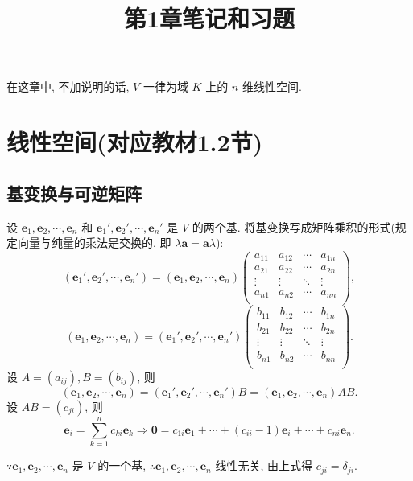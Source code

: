 \documentclass{ctexart}
\title{第1章笔记和习题}
\begin{document}
\maketitle
在这章中, 不加说明的话, $V$ 一律为域 $K$ 上的 $n$ 维线性空间.
\section{线性空间(对应教材1.2节)}
\subsection{基变换与可逆矩阵}
设 $\boldsymbol{e}_1,\boldsymbol{e}_2,\cdots,\boldsymbol{e}_n$ 和 $\boldsymbol{e}_1',\boldsymbol{e}_2',\cdots,\boldsymbol{e}_n'$ 是 $V$ 的两个基. 将基变换写成矩阵乘积的形式(规定向量与纯量的乘法是交换的, 即 $\lambda\boldsymbol{a}=\boldsymbol{a}\lambda$):
\begin{equation}\label{eq1.1}
    (\boldsymbol{e}_1',\boldsymbol{e}_2',\cdots,\boldsymbol{e}_n')=(\boldsymbol{e}_1,\boldsymbol{e}_2,\cdots,\boldsymbol{e}_n)\begin{pmatrix}
        a_{11} & a_{12} & \cdots & a_{1n} \\
        a_{21} & a_{22} & \cdots & a_{2n} \\
        \vdots & \vdots & \ddots & \vdots \\
        a_{n1} & a_{n2} & \cdots & a_{nn} \\
    \end{pmatrix},
\end{equation}
\[(\boldsymbol{e}_1,\boldsymbol{e}_2,\cdots,\boldsymbol{e}_n)=(\boldsymbol{e}_1',\boldsymbol{e}_2',\cdots,\boldsymbol{e}_n')\begin{pmatrix}
    b_{11} & b_{12} & \cdots & b_{1n} \\
    b_{21} & b_{22} & \cdots & b_{2n} \\
    \vdots & \vdots & \ddots & \vdots \\
    b_{n1} & b_{n2} & \cdots & b_{nn} \\
\end{pmatrix}.\]
设 $A=(a_{ij}),B=(b_{ij})$, 则
\[(\boldsymbol{e}_1,\boldsymbol{e}_2,\cdots,\boldsymbol{e}_n)=(\boldsymbol{e}_1',\boldsymbol{e}_2',\cdots,\boldsymbol{e}_n')B=(\boldsymbol{e}_1,\boldsymbol{e}_2,\cdots,\boldsymbol{e}_n)AB.\]
设 $AB=(c_{ji})$, 则
\[\boldsymbol{e}_i=\sum\limits_{k=1}^nc_{ki}\boldsymbol{e}_k\Rightarrow\boldsymbol{0}=c_{1i}\boldsymbol{e}_1+\cdots+(c_{ii}-1)\boldsymbol{e}_i+\cdots+c_{ni}\boldsymbol{e}_n.\]

$\because\boldsymbol{e}_1,\boldsymbol{e}_2,\cdots,\boldsymbol{e}_n$ 是 $V$ 的一个基, $\therefore\boldsymbol{e}_1,\boldsymbol{e}_2,\cdots,\boldsymbol{e}_n$ 线性无关, 由上式得 $c_{ji}=\delta_{ji}$.
\end{document}
